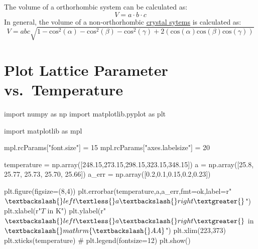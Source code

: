 \documentclass[
  letterpaper,
  DIV=11,
  numbers=noendperiod]{scrreprt}
\newenvironment{Shaded}{\begin{snugshade}}{\end{snugshade}}
\newcommand{\CommentTok}[1]{\textcolor[rgb]{0.37,0.37,0.37}{#1}}
\newcommand{\DecValTok}[1]{\textcolor[rgb]{0.68,0.00,0.00}{#1}}
\newcommand{\FloatTok}[1]{\textcolor[rgb]{0.68,0.00,0.00}{#1}}
\newcommand{\ImportTok}[1]{\textcolor[rgb]{0.00,0.46,0.62}{#1}}
\newcommand{\NormalTok}[1]{\textcolor[rgb]{0.00,0.23,0.31}{#1}}
\newcommand{\OperatorTok}[1]{\textcolor[rgb]{0.37,0.37,0.37}{#1}}
\newcommand{\StringTok}[1]{\textcolor[rgb]{0.13,0.47,0.30}{#1}}
\newcommand{\VerbatimStringTok}[1]{\textcolor[rgb]{0.13,0.47,0.30}{#1}}
\begin{document}
The volume of a orthorhombic system can be calculated as: \[
V = a\cdot b \cdot c
\] In general, the volume of a non-orthorhombic
\href{https://en.wikipedia.org/wiki/Crystal_system}{crystal sytems} is
calculated as: \[
V = a b c \sqrt{1-\mathrm{cos}^2(\alpha) -\mathrm{cos}^2(\beta) - \mathrm{cos}^2(\gamma)+ 2(\mathrm{cos}(\alpha) \mathrm{cos}(\beta) \mathrm{cos}(\gamma))}
\]

\hypertarget{plot-lattice-parameter-vs.-temperature}{%
\section{Plot Lattice Parameter
vs.~Temperature}\label{plot-lattice-parameter-vs.-temperature}}

\begin{Shaded}
\begin{Highlighting}[]
\ImportTok{import}\NormalTok{ numpy }\ImportTok{as}\NormalTok{ np}
\ImportTok{import}\NormalTok{ matplotlib.pyplot }\ImportTok{as}\NormalTok{ plt}

\ImportTok{import}\NormalTok{ matplotlib }\ImportTok{as}\NormalTok{ mpl}

\NormalTok{mpl.rcParams[}\StringTok{"font.size"}\NormalTok{] }\OperatorTok{=} \DecValTok{15}
\NormalTok{mpl.rcParams[}\StringTok{"axes.labelsize"}\NormalTok{] }\OperatorTok{=} \DecValTok{20}

\NormalTok{temperature }\OperatorTok{=}\NormalTok{ np.array([}\FloatTok{248.15}\NormalTok{,}\FloatTok{273.15}\NormalTok{,}\FloatTok{298.15}\NormalTok{,}\FloatTok{323.15}\NormalTok{,}\FloatTok{348.15}\NormalTok{])}
\NormalTok{a }\OperatorTok{=}\NormalTok{ np.array([}\FloatTok{25.8}\NormalTok{, }\FloatTok{25.77}\NormalTok{, }\FloatTok{25.73}\NormalTok{, }\FloatTok{25.70}\NormalTok{, }\FloatTok{25.66}\NormalTok{])}
\NormalTok{a\_err }\OperatorTok{=}\NormalTok{ np.array([}\FloatTok{0.2}\NormalTok{,}\FloatTok{0.1}\NormalTok{,}\FloatTok{0.15}\NormalTok{,}\FloatTok{0.2}\NormalTok{,}\FloatTok{0.23}\NormalTok{])}

\NormalTok{plt.figure(figsize}\OperatorTok{=}\NormalTok{(}\DecValTok{8}\NormalTok{,}\DecValTok{4}\NormalTok{))}
\NormalTok{plt.errorbar(temperature,a,a\_err,fmt}\OperatorTok{=}\StringTok{\textquotesingle{}ok\textquotesingle{}}\NormalTok{,label}\OperatorTok{=}\VerbatimStringTok{r"$\textbackslash{}left \textless{} a \textbackslash{}right \textgreater{}$"}\NormalTok{)}
\NormalTok{plt.xlabel(}\VerbatimStringTok{r"$T$ in K"}\NormalTok{)}
\NormalTok{plt.ylabel(}\VerbatimStringTok{r"$\textbackslash{}left \textless{} a \textbackslash{}right \textgreater{} $ in $\textbackslash{}mathrm\{\textbackslash{}AA\}$"}\NormalTok{)}
\NormalTok{plt.xlim(}\DecValTok{223}\NormalTok{,}\DecValTok{373}\NormalTok{)}
\NormalTok{plt.xticks(temperature)}
\CommentTok{\# plt.legend(fontsize=12)}
\NormalTok{plt.show()}
\end{Highlighting}
\end{Shaded}
\end{document}
